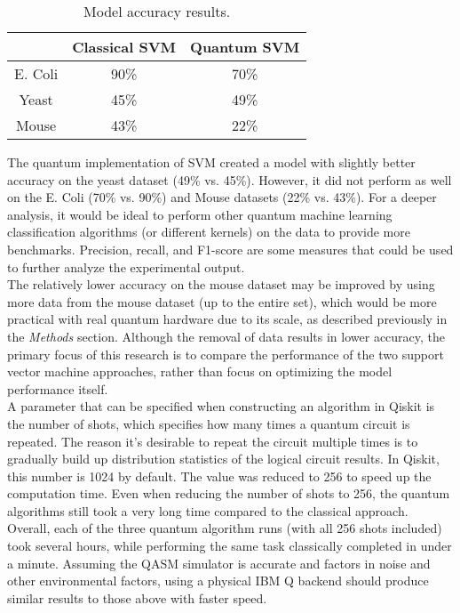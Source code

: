 \documentclass{article}
\begin{document}
    \begin{table}[h]
      \centering
      \begin{tabular}{c|c|c|}
      \cline{2-3}
                                    & Classical SVM & Quantum SVM \\ \hline
      \multicolumn{1}{|c|}{E. Coli} & 90\%          & 70\%        \\ \hline
      \multicolumn{1}{|c|}{Yeast}   & 45\%          & 49\%        \\ \hline
      \multicolumn{1}{|c|}{Mouse}   & 43\%          & 22\%        \\ \hline
      \end{tabular}
      \caption{\label{table:accuracy}Model accuracy results.}
    \end{table}

    The quantum implementation of SVM created a model with slightly better accuracy on the yeast dataset (49\% vs. 45\%). However, it did not perform as well on the E. Coli (70\% vs. 90\%) and Mouse datasets (22\% vs. 43\%). For a deeper analysis, it would be ideal to perform other quantum machine learning classification algorithms (or different kernels) on the data to provide more benchmarks. Precision, recall, and F1-score are some measures that could be used to further analyze the experimental output. \\

    The relatively lower accuracy on the mouse dataset may be improved by using more data from the mouse dataset (up to the entire set), which would be more practical with real quantum hardware due to its scale, as described previously in the \textit{Methods} section. Although the removal of data results in lower accuracy, the primary focus of this research is to compare the performance of the two support vector machine approaches, rather than focus on optimizing the model performance itself. \\

    A parameter that can be specified when constructing an algorithm in Qiskit is the number of shots, which specifies how many times a quantum circuit is repeated. The reason it's desirable to repeat the circuit multiple times is to gradually build up distribution statistics of the logical circuit results. In Qiskit, this number is 1024 by default. The value was reduced to 256 to speed up the computation time. Even when reducing the number of shots to 256, the quantum algorithms still took a very long time compared to the classical approach. Overall, each of the three quantum algorithm runs (with all 256 shots included) took several hours, while performing the same task classically completed in under a minute. Assuming the QASM simulator is accurate and factors in noise and other environmental factors, using a physical IBM Q backend should produce similar results to those above with faster speed.
\end{document}
